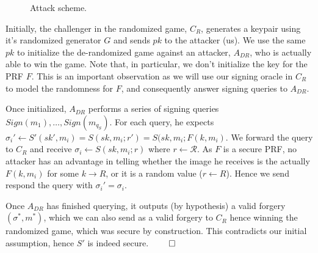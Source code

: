 \begin{figure}[h!]
    \caption{Attack scheme.\label{fig:attack-game}}
\end{figure}

Initially, the challenger in the randomized game, $C_R$, generates a keypair using it's randomized generator $G$ and sends $pk$ to the attacker (us).
We use the same $pk$ to initialize the de-randomized game against an attacker, $A_{DR}$, who is actually able to win the game.
Note that, in particular, we don't initialize the key for the PRF $F$.
This is an important observation as we will use our signing oracle in $C_R$ to model the randomness for $F$, and consequently answer signing queries to $A_{DR}$.

Once initialized, $A_{DR}$ performs a series of signing queries $Sign(m_1), \dots, Sign(m_{q_S})$.
For each query, he expects $\sigma_i' \leftarrow S'(sk', m_i) = S(sk, m_i; r') = S(sk, m_i; F(k, m_i)$.
We forward the query to $C_R$ and receive $\sigma_i \leftarrow S(sk, m_i; r)$ where $r \leftarrow \mathcal{R}$.
As $F$ is a secure PRF, no attacker has an advantage in telling whether the image he receives is the actually $F(k, m_i)$ for some $k \rightarrow R$, or it is a random value ($r \leftarrow R$).
Hence we send respond the query with $\sigma_i' = \sigma_i$.

Once $A_{DR}$ has finished querying, it outputs (by hypothesis) a valid forgery $(\sigma^*, m^*)$, which we can also send as a valid forgery to $C_R$ hence winning the randomized game, which was secure by construction.
This contradicts our initial assumption, hence $S'$ is indeed secure. \hfill $\qed$

